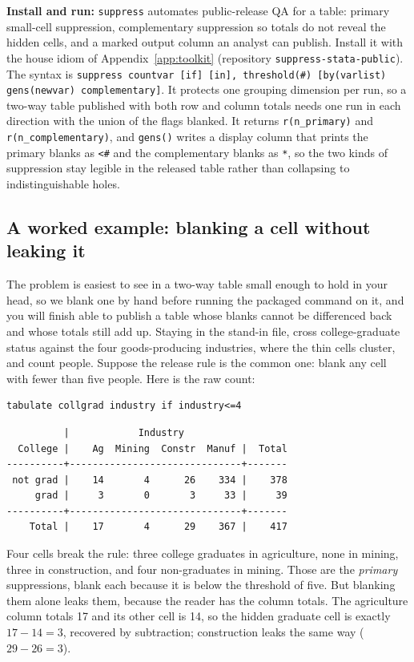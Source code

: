 \begin{kaobox}[frametitle=Package Integration: \texttt{suppress}]
\textbf{Install and run:} \texttt{suppress} automates public-release QA for a table: primary small-cell suppression, complementary suppression so totals do not reveal the hidden cells, and a marked output column an analyst can publish. Install it with the house idiom of Appendix~\ref{app:toolkit} (repository \texttt{suppress-stata-public}).
The syntax is \texttt{suppress countvar [if] [in], threshold(\#) [by(varlist) gens(newvar) complementary]}. It protects one grouping dimension per run, so a two-way table published with both row and column totals needs one run in each direction with the union of the flags blanked. It returns \texttt{r(n\_primary)} and \texttt{r(n\_complementary)}, and \texttt{gens()} writes a display column that prints the primary blanks as \texttt{<\#} and the complementary blanks as \texttt{*}, so the two kinds of suppression stay legible in the released table rather than collapsing to indistinguishable holes.
\end{kaobox}

\subsection{A worked example: blanking a cell without leaking it}\label{sec:supexample}
The problem is easiest to see in a two-way table small enough to hold in your head, so we blank one by hand before running the packaged command on it, and you will finish able to publish a table whose blanks cannot be differenced back and whose totals still add up. Staying in the stand-in file, cross college-graduate status against the four goods-producing industries, where the thin cells cluster, and count people. Suppose the release rule is the common one: blank any cell with fewer than five people. Here is the raw count:
\par
{\footnotesize
\begin{verbatim}
tabulate collgrad industry if industry<=4
\end{verbatim}
}
\par
{\footnotesize
\begin{verbatim}
          |            Industry
  College |    Ag  Mining  Constr  Manuf |  Total
----------+------------------------------+-------
 not grad |    14       4      26    334 |    378
     grad |     3       0       3     33 |     39
----------+------------------------------+-------
    Total |    17       4      29    367 |    417
\end{verbatim}
}
Four cells break the rule: three college graduates in agriculture, none in mining, three in construction, and four non-graduates in mining. Those are the \emph{primary} suppressions, blank each because it is below the threshold of five. But blanking them alone leaks them, because the reader has the column totals. The agriculture column totals 17 and its other cell is 14, so the hidden graduate cell is exactly $17-14=3$, recovered by subtraction; construction leaks the same way ($29-26=3$). 

